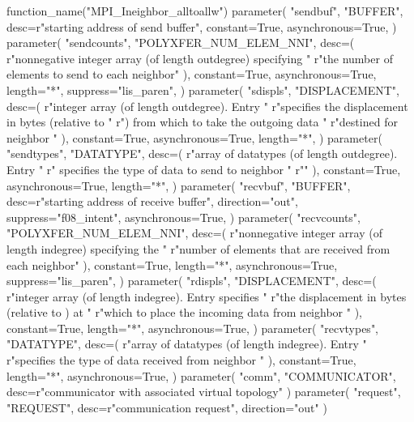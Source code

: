 \begin{mpi-binding}
    function_name("MPI_Ineighbor_alltoallw")
    parameter(
        "sendbuf",
        "BUFFER",
        desc=r"starting address of send buffer",
        constant=True,
        asynchronous=True,
    )
    parameter(
        "sendcounts",
        "POLYXFER_NUM_ELEM_NNI",
        desc=(
            r"nonnegative integer array (of length outdegree) specifying "
            r"the number of elements to send to each neighbor"
        ),
        constant=True,
        asynchronous=True,
        length="*",
        suppress="lis_paren",
    )
    parameter(
        "sdispls",
        "DISPLACEMENT",
        desc=(
            r"integer array (of length outdegree). Entry  "
            r"specifies the displacement in bytes (relative to "
            r") from which to take the outgoing data "
            r"destined for neighbor "
        ),
        constant=True,
        asynchronous=True,
        length="*",
    )
    parameter(
        "sendtypes",
        "DATATYPE",
        desc=(
            r"array of datatypes (of length outdegree). Entry "
            r" specifies the type of data to send to neighbor "
            r""
        ),
        constant=True,
        asynchronous=True,
        length="*",
    )
    parameter(
        "recvbuf",
        "BUFFER",
        desc=r"starting address of receive buffer",
        direction="out",
        suppress="f08_intent",
        asynchronous=True,
    )
    parameter(
        "recvcounts",
        "POLYXFER_NUM_ELEM_NNI",
        desc=(
            r"nonnegative integer array (of length indegree) specifying the "
            r"number of elements that are received from each neighbor"
        ),
        constant=True,
        length="*",
        asynchronous=True,
        suppress="lis_paren",
    )
    parameter(
        "rdispls",
        "DISPLACEMENT",
        desc=(
            r"integer array (of length indegree). Entry  specifies "
            r"the displacement in bytes (relative to ) at "
            r"which to place the incoming data from neighbor "
        ),
        constant=True,
        length="*",
        asynchronous=True,
    )
    parameter(
        "recvtypes",
        "DATATYPE",
        desc=(
            r"array of datatypes (of length indegree). Entry  "
            r"specifies the type of data received from neighbor "
        ),
        constant=True,
        length="*",
        asynchronous=True,
    )
    parameter(
        "comm", "COMMUNICATOR", desc=r"communicator with associated virtual topology"
    )
    parameter(
        "request", "REQUEST", desc=r"communication request", direction="out"
    )
\end{mpi-binding}

